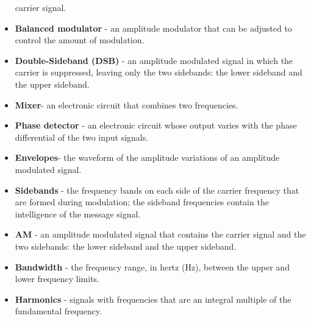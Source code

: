 \begin{itemize}
carrier signal.
\item \textbf{Balanced modulator} - an amplitude modulator that can be adjusted to control the
amount of modulation.
\item \textbf{Double-Sideband (DSB)} - an amplitude modulated signal in which the carrier is
suppressed, leaving only the two sidebands: the lower sideband and the upper
sideband.
\item \textbf{Mixer}- an electronic circuit that combines two frequencies.
\item \textbf{Phase detector} - an electronic circuit whose output varies with the phase differential
of the two input signals.
\item \textbf{Envelopes}- the waveform of the amplitude variations of an amplitude modulated
signal. 
\item \textbf{Sidebands} - the frequency bands on each side of the carrier frequency that
are formed during modulation; the sideband frequencies contain the intelligence of
the message signal.
\item \textbf{AM} - an amplitude modulated signal that contains the carrier signal and the two
sidebands: the lower sideband and the upper sideband.
\item \textbf{Bandwidth} - the frequency range, in hertz (Hz), between the upper and lower
frequency limits. 
\item \textbf{Harmonics} - signals with frequencies that are an integral multiple of
the fundamental frequency. 

\end {itemize}
